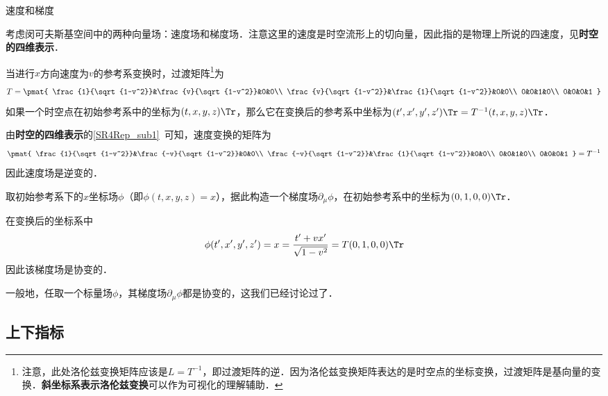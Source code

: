 \begin{example}{速度和梯度}

考虑闵可夫斯基空间中的两种向量场：速度场和梯度场．注意这里的速度是时空流形上的切向量，因此指的是物理上所说的四速度，见\textbf{时空的四维表示}．

当进行$x$方向速度为$v$的参考系变换时，过渡矩阵\footnote{注意，此处洛伦兹变换矩阵应该是$L=T^{-1}$，即过渡矩阵的逆．因为洛伦兹变换矩阵表达的是时空点的坐标变换，过渡矩阵是基向量的变换．\textbf{斜坐标系表示洛伦兹变换}可以作为可视化的理解辅助．}为
\begin{equation}
T=
\pmat{
    \frac{1}{\sqrt{1-v^2}}&\frac{v}{\sqrt{1-v^2}}&0&0\\
    \frac{v}{\sqrt{1-v^2}}&\frac{1}{\sqrt{1-v^2}}&0&0\\
    0&0&1&0\\
    0&0&0&1
}
\end{equation}
如果一个时空点在初始参考系中的坐标为$(t, x, y, z)\Tr$，那么它在变换后的参考系中坐标为$(t', x', y', z')\Tr=T^{-1}(t, x, y, z)\Tr$．


由\textbf{时空的四维表示}的\autoref{SR4Rep_sub1}~可知，速度变换的矩阵为
\begin{equation}
\pmat{
    \frac{1}{\sqrt{1-v^2}}&\frac{-v}{\sqrt{1-v^2}}&0&0\\
    \frac{-v}{\sqrt{1-v^2}}&\frac{1}{\sqrt{1-v^2}}&0&0\\
    0&0&1&0\\
    0&0&0&1
}
=T^{-1}
\end{equation}
因此速度场是逆变的．

取初始参考系下的$x$坐标场$\phi$（即$\phi(t, x, y, z)=x$），据此构造一个梯度场$\partial_\mu \phi$，在初始参考系中的坐标为$(0, 1, 0, 0)\Tr$．

在变换后的坐标系中
\begin{equation}
\phi(t', x', y', z')=x=\frac{t'+vx'}{\sqrt{1-v^2}}=T(0, 1, 0, 0)\Tr
\end{equation}
因此该梯度场是协变的．

一般地，任取一个标量场$\phi$，其梯度场$\partial_\mu\phi$都是协变的，这我们已经讨论过了．

\end{example}




\subsection{上下指标}

